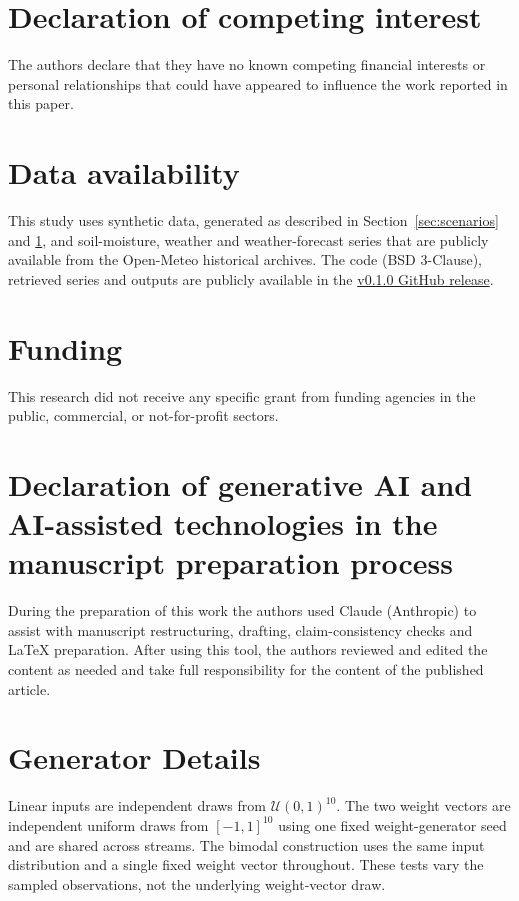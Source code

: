 \documentclass[preprint,12pt]{elsarticle}
\begin{document}
\section*{Declaration of competing interest}
The authors declare that they have no known competing financial interests or personal relationships that could have appeared to influence the work reported in this paper.

\section*{Data availability}

This study uses synthetic data, generated as described in Section~\ref{sec:scenarios} and \ref{app:generators}, and soil-moisture, weather and weather-forecast series that are publicly available from the Open-Meteo historical archives. The code (BSD 3-Clause), retrieved series and outputs are publicly available in the \href{https://github.com/FBK-OpenIoT/calibrated-wasserstein-drift/releases/tag/v0.1.0}{v0.1.0 GitHub release}.

\section*{Funding}
This research did not receive any specific grant from funding agencies in the public, commercial, or not-for-profit sectors.

\section*{Declaration of generative AI and AI-assisted technologies in the manuscript preparation process}
During the preparation of this work the authors used Claude (Anthropic) to assist with manuscript restructuring, drafting, claim-consistency checks and LaTeX preparation. After using this tool, the authors reviewed and edited the content as needed and take full responsibility for the content of the published article.


\clearpage\appendix
{}
\section{Generator Details}\label{app:generators}
Linear inputs are independent draws from $\mathcal U(0,1)^{10}$. The two weight vectors are independent uniform draws from $[-1,1]^{10}$ using one fixed weight-generator seed and are shared across streams. The bimodal construction uses the same input distribution and a single fixed weight vector throughout. These tests vary the sampled observations, not the underlying weight-vector draw.
\end{document}
